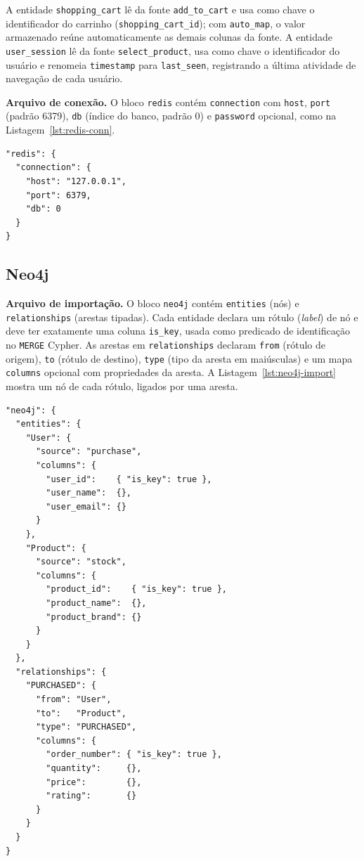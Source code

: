 A entidade \texttt{shopping\_cart} lê da fonte \texttt{add\_to\_cart} e usa como chave o
identificador do carrinho (\texttt{shopping\_cart\_id}); com \texttt{auto\_map}, o valor
armazenado reúne automaticamente as demais colunas da fonte. A entidade
\texttt{user\_session} lê da fonte \texttt{select\_product}, usa como chave o
identificador do usuário e renomeia \texttt{timestamp} para \texttt{last\_seen},
registrando a última atividade de navegação de cada usuário.

\textbf{Arquivo de conexão.} O bloco \texttt{redis} contém \texttt{connection}
com \texttt{host}, \texttt{port} (padrão 6379), \texttt{db} (índice do banco,
padrão 0) e \texttt{password} opcional, como na Listagem~\ref{lst:redis-conn}.

\begin{lstlisting}[style=jsonstyle,caption={Fragmento de conexão Redis.},label={lst:redis-conn}]
"redis": {
  "connection": {
    "host": "127.0.0.1",
    "port": 6379,
    "db": 0
  }
}
\end{lstlisting}

\subsection{Neo4j}

\textbf{Arquivo de importação.} O bloco \texttt{neo4j} contém \texttt{entities}
(nós) e \texttt{relationships} (arestas tipadas). Cada entidade declara um rótulo
(\textit{label}) de nó e deve ter exatamente uma coluna \texttt{is\_key}, usada como
predicado de identificação no \texttt{MERGE} Cypher. As arestas em
\texttt{relationships} declaram \texttt{from} (rótulo de origem), \texttt{to}
(rótulo de destino), \texttt{type} (tipo da aresta em maiúsculas) e um mapa
\texttt{columns} opcional com propriedades da aresta. A Listagem~\ref{lst:neo4j-import}
mostra um nó de cada rótulo, ligados por uma aresta.

\begin{lstlisting}[style=jsonstyle,caption={Fragmento de importação Neo4j (nós e aresta).},label={lst:neo4j-import}]
"neo4j": {
  "entities": {
    "User": {
      "source": "purchase",
      "columns": {
        "user_id":    { "is_key": true },
        "user_name":  {},
        "user_email": {}
      }
    },
    "Product": {
      "source": "stock",
      "columns": {
        "product_id":    { "is_key": true },
        "product_name":  {},
        "product_brand": {}
      }
    }
  },
  "relationships": {
    "PURCHASED": {
      "from": "User",
      "to":   "Product",
      "type": "PURCHASED",
      "columns": {
        "order_number": { "is_key": true },
        "quantity":     {},
        "price":        {},
        "rating":       {}
      }
    }
  }
}
\end{lstlisting}

